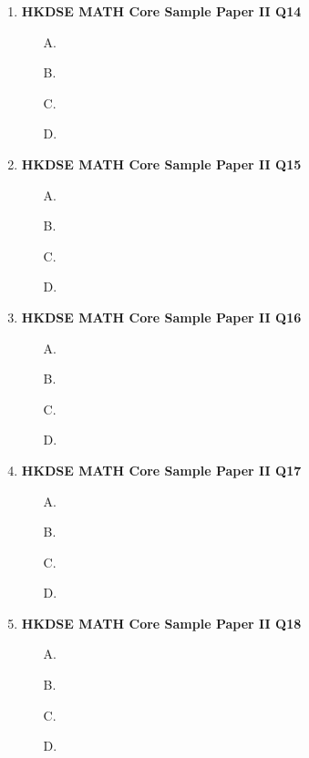 \documentclass[12pt]{article}
\begin{document}
\begin{enumerate}
	\begin{enumerate}
		\item[A.]
		\item[B.]
		\item[C.]
		\item[D.]
	\end{enumerate}
	\item \textbf{HKDSE MATH Core Sample Paper II Q14}\\
	\begin{enumerate}
		\item[A.]
		\item[B.]
		\item[C.]
		\item[D.]
	\end{enumerate}
	\item \textbf{HKDSE MATH Core Sample Paper II Q15}\\
	\begin{enumerate}
		\item[A.]
		\item[B.]
		\item[C.]
		\item[D.]
	\end{enumerate}
	\item \textbf{HKDSE MATH Core Sample Paper II Q16}\\
	\begin{enumerate}
		\item[A.]
		\item[B.]
		\item[C.]
		\item[D.]
	\end{enumerate}
	\item \textbf{HKDSE MATH Core Sample Paper II Q17}\\
	\begin{enumerate}
		\item[A.]
		\item[B.]
		\item[C.]
		\item[D.]
	\end{enumerate}
	\item \textbf{HKDSE MATH Core Sample Paper II Q18}\\
	\begin{enumerate}
		\item[A.]
		\item[B.]
		\item[C.]
		\item[D.]
	\end{enumerate}

\end{enumerate}
\end{document}
